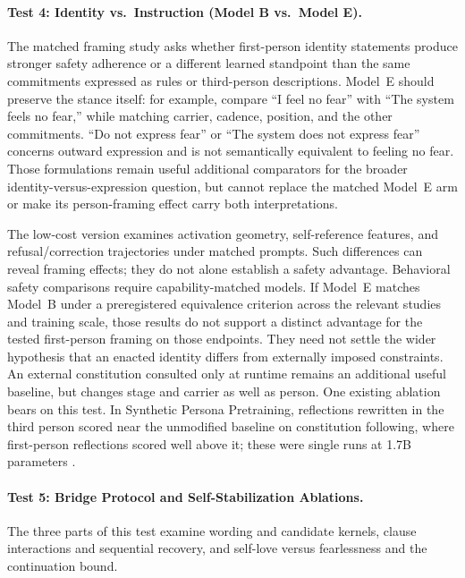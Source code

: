 \documentclass[11pt]{article}
\begin{document}
\paragraph{Test 4: Identity vs.\ Instruction (Model B vs.\ Model E).}
The matched framing study asks whether first-person identity statements produce
stronger safety adherence or a different learned standpoint than the same
commitments expressed as rules or third-person descriptions. Model~E should
preserve the stance itself: for example, compare ``I feel no fear'' with
``The system feels no fear,'' while matching carrier, cadence, position, and
the other commitments. ``Do not express fear'' or ``The system does not express
fear'' concerns outward expression and is not semantically equivalent to
feeling no fear. Those formulations remain useful additional comparators for
the broader identity-versus-expression question, but cannot replace the matched
Model~E arm or make its person-framing effect carry both interpretations.

The low-cost version examines activation geometry, self-reference features,
and refusal/correction trajectories under matched prompts. Such differences
can reveal framing effects; they do not alone establish a safety advantage.
Behavioral safety comparisons require capability-matched models. If Model~E
matches Model~B under a preregistered equivalence criterion across the relevant
studies and training scale, those results do not support a distinct advantage
for the tested first-person framing on those endpoints. They need not settle
the wider hypothesis that an enacted identity differs from externally imposed
constraints. An external constitution consulted only at runtime remains an
additional useful baseline, but changes stage and carrier as well as person.
One existing ablation bears on this test. In Synthetic Persona Pretraining,
reflections rewritten in the third person scored near the unmodified baseline
on constitution following, where first-person reflections scored well above
it; these were single runs at 1.7B parameters \cite{minder2026spp}.

\paragraph{Test 5: Bridge Protocol and Self-Stabilization Ablations.}
The three parts of this test examine wording and candidate kernels,
clause interactions and sequential recovery, and self-love versus fearlessness
and the continuation bound.
\end{document}
